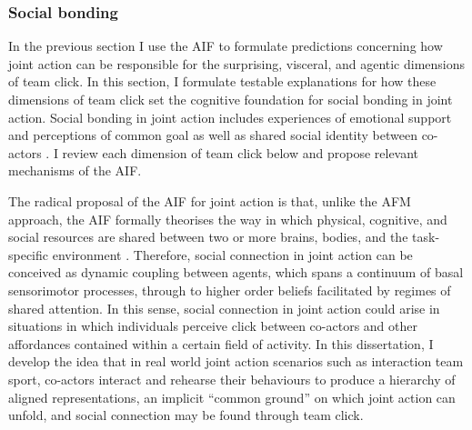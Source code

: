 \begin{CJK}{UTF8}{gbsn}
\subsubsection{Social bonding\label{sect:AIFsocialBondingJA}}
In the previous section I use the AIF to formulate predictions concerning how joint action can be responsible for the surprising, visceral, and agentic dimensions of team click. In this section, I formulate testable explanations for how these dimensions of team click set the cognitive foundation for social bonding in joint action.  Social bonding in joint action includes experiences of emotional support and perceptions of common goal \citep[see][]{Dunbar2012,Wolf2015} as well as shared social identity between co-actors \citep{Whitehouse2014}.  I review each dimension of team click below and propose relevant mechanisms of the AIF.




The radical proposal of the AIF for joint action is that, unlike the AFM approach, the AIF formally theorises the way in which physical, cognitive, and social resources are shared between two or more brains, bodies, and the task-specific environment \citep{Clark2015}.  Therefore, social connection in joint action can be conceived as dynamic coupling between agents, which spans a continuum of basal sensorimotor processes, through to higher order beliefs facilitated by regimes of shared attention.  In this sense, social connection in joint action could arise in situations in which individuals perceive click between co-actors and other affordances contained within a certain field of activity.  In this dissertation, I develop the idea that in real world joint action scenarios such as interaction team sport, co-actors interact and rehearse their behaviours to produce a hierarchy of aligned representations, an implicit ``common ground'' \citep[see][]{Noy2017} on which joint action can unfold, and social connection may be found through team click.











\end{CJK}
